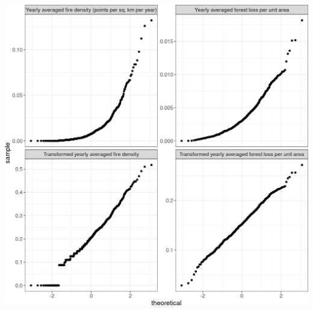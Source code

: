 \documentclass[10pt,landscape,a3paper]{article}
\begin{document}
\begin{center}\includegraphics{img/modelling/lta-esda-17} \end{center}
\end{document}
